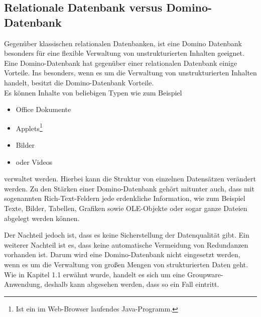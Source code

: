 \subsection{Relationale Datenbank versus Domino-Datenbank}
\label{sec:3dominoDB}
Gegen\"uber klassischen relationalen Datenbanken, ist eine Domino Datenbank besonders f\"ur eine flexible Verwaltung von unstrukturierten Inhalten
geeignet.
Eine Domino-Datenbank hat gegenüber einer relationalen Datenbank einige Vorteile. Ins besonders, wenn es um die Verwaltung von unstrukturierten 
Inhalten handelt, besitzt die Domino-Datenbank Vorteile.\\
Es können Inhalte von beliebigen Typen wie zum Beispiel
\begin{itemize}
\item Office Dokumente
\item Applets\footnote{Ist ein im Web-Browser laufendes Java-Programm. }
\item Bilder
\item oder Videos
\end{itemize}
verwaltet werden. Hierbei kann die Struktur von einzelnen Datensätzen verändert werden\cite{knaepper}. 
Zu den Stärken einer Domino-Datenbank gehört mitunter auch, dass mit sogenannten Rich-Text-Feldern jede erdenkliche Information, wie zum Beispiel
Texte, Bilder, Tabellen, Grafiken sowie OLE-Objekte oder sogar ganze Dateien abgelegt werden können\cite{ebel}. 

Der Nachteil jedoch ist, dass es keine Sicherstellung 
der Datenqualität gibt. Ein weiterer Nachteil ist es, dass keine automatische Vermeidung von Redundanzen vorhanden ist. Darum wird eine Domino-Datenbank
nicht eingesetzt werden, wenn es um die Verwaltung von großen Mengen von strukturierten Daten geht. Wie in Kapitel 1.1 erwähnt wurde, handelt es 
sich um eine Groupware-Anwendung, deshalb kann abgesehen werden, dass so ein Fall eintritt\cite{knaepper}.\newline

%

